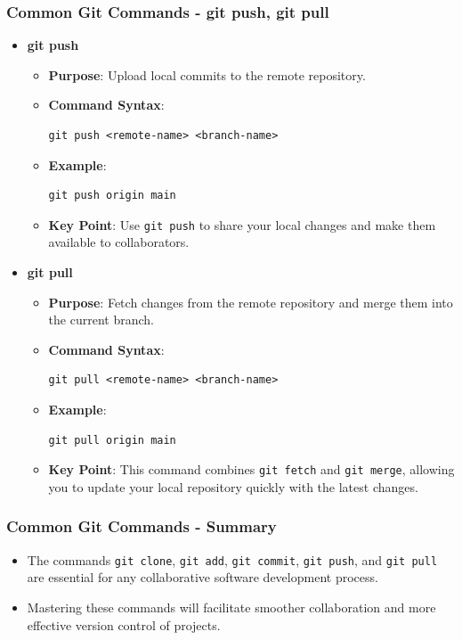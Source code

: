 \documentclass{beamer}
\begin{document}
\begin{frame}[fragile]
    \frametitle{Common Git Commands - git push, git pull}
    \begin{itemize}
        \item \textbf{git push}
        \begin{itemize}
            \item \textbf{Purpose}: Upload local commits to the remote repository.
            \item \textbf{Command Syntax}: 
            \begin{lstlisting}
git push <remote-name> <branch-name>
            \end{lstlisting}
            \item \textbf{Example}: 
            \begin{lstlisting}
git push origin main
            \end{lstlisting}
            \item \textbf{Key Point}: 
            Use \texttt{git push} to share your local changes and make them available to collaborators.
        \end{itemize}
        
        \item \textbf{git pull}
        \begin{itemize}
            \item \textbf{Purpose}: Fetch changes from the remote repository and merge them into the current branch.
            \item \textbf{Command Syntax}: 
            \begin{lstlisting}
git pull <remote-name> <branch-name>
            \end{lstlisting}
            \item \textbf{Example}: 
            \begin{lstlisting}
git pull origin main
            \end{lstlisting}
            \item \textbf{Key Point}: 
            This command combines \texttt{git fetch} and \texttt{git merge}, allowing you to update your local repository quickly with the latest changes.
        \end{itemize}
    \end{itemize}
\end{frame}

\begin{frame}[fragile]
    \frametitle{Common Git Commands - Summary}
    \begin{itemize}
        \item The commands \texttt{git clone}, \texttt{git add}, \texttt{git commit}, \texttt{git push}, and \texttt{git pull} are essential for any collaborative software development process.
        \item Mastering these commands will facilitate smoother collaboration and more effective version control of projects.
    \end{itemize}
\end{frame}
\end{document}
